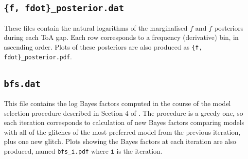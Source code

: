 \documentclass{article}
\begin{document}
\subsection{\texttt{\{f, fdot\}\_posterior.dat}}
These files contain the natural logarithms of the marginalised $f$ and $\dot{f}$ posteriors during each ToA gap.
Each row corresponds to a frequency (derivative) bin, in ascending order.
Plots of these posteriors are also produced as \texttt{\{f, fdot\}\_posterior.pdf}.

\subsection{\texttt{bfs.dat}}
This file contains the log Bayes factors computed in the course of the model selection procedure described in Section 4 of \citet{MelatosDunn2020}.
The procedure is a greedy one, so each iteration corresponds to calculation of new Bayes factors comparing models with all of the glitches of the most-preferred model from the previous iteration, plus one new glitch.
Plots showing the Bayes factors at each iteration are also produced, named \texttt{bfs\_i.pdf} where \texttt{i} is the iteration.
\end{document}

